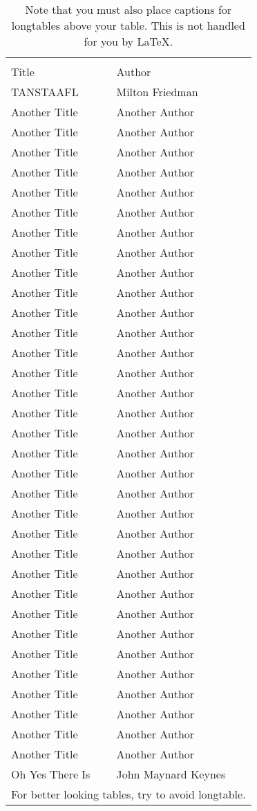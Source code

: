 \documentclass[12pt,econ]{authesis}
\begin{document}
\begin{center}
\begin{longtable}{ll}\hline\hline
\caption{Note that you must also place captions for longtables above your table.
This is not handled for you by LaTeX.}
\\
Title & Author \\ \hline
TANSTAAFL & Milton Friedman \\
Another Title & Another Author \\
Another Title & Another Author \\
Another Title & Another Author \\
Another Title & Another Author \\
Another Title & Another Author \\
Another Title & Another Author \\
Another Title & Another Author \\
Another Title & Another Author \\
Another Title & Another Author \\
Another Title & Another Author \\
Another Title & Another Author \\
Another Title & Another Author \\
Another Title & Another Author \\
Another Title & Another Author \\
Another Title & Another Author \\
Another Title & Another Author \\
Another Title & Another Author \\
Another Title & Another Author \\
Another Title & Another Author \\
Another Title & Another Author \\
Another Title & Another Author \\
Another Title & Another Author \\
Another Title & Another Author \\
Another Title & Another Author \\
Another Title & Another Author \\
Another Title & Another Author \\
Another Title & Another Author \\
Another Title & Another Author \\
Another Title & Another Author \\
Another Title & Another Author \\
Another Title & Another Author \\
Another Title & Another Author \\
Another Title & Another Author \\
Oh Yes There Is & John Maynard Keynes \\ \hline
\multicolumn{2}{c}{\small For better looking tables, try to avoid longtable.}
\end{longtable}
\end{center}
\end{document}
